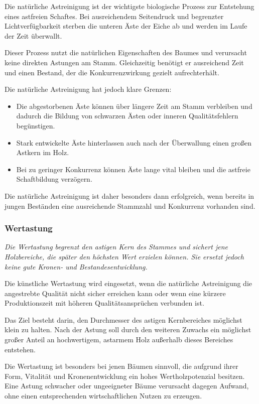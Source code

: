 \documentclass[twocolumn, bibliography=totoc, abstract=true]{scrartcl}
\begin{document}
Die natürliche Astreinigung ist der wichtigste biologische Prozess zur Entstehung eines astfreien Schaftes. Bei ausreichendem Seitendruck und begrenzter Lichtverfügbarkeit sterben die unteren Äste der Eiche ab und werden im Laufe der Zeit überwallt.

Dieser Prozess nutzt die natürlichen Eigenschaften des Baumes und verursacht keine direkten Astungen am Stamm. Gleichzeitig benötigt er ausreichend Zeit und einen Bestand, der die Konkurrenzwirkung gezielt aufrechterhält.

Die natürliche Astreinigung hat jedoch klare Grenzen:

\begin{itemize}
\item Die abgestorbenen Äste können über längere Zeit am Stamm verbleiben und dadurch die Bildung von schwarzen Ästen oder inneren Qualitätsfehlern begünstigen.
\item Stark entwickelte Äste hinterlassen auch nach der Überwallung einen großen Astkern im Holz.
\item Bei zu geringer Konkurrenz können Äste lange vital bleiben und die astfreie Schaftbildung verzögern.
\end{itemize}

Die natürliche Astreinigung ist daher besonders dann erfolgreich, wenn bereits in jungen Beständen eine ausreichende Stammzahl und Konkurrenz vorhanden sind.

\subsubsection{Wertastung}

\emph{Die Wertastung begrenzt den astigen Kern des Stammes und sichert jene Holzbereiche, die später den höchsten Wert erzielen können. Sie ersetzt jedoch keine gute Kronen- und Bestandesentwicklung.}

Die künstliche Wertastung wird eingesetzt, wenn die natürliche Astreinigung die angestrebte Qualität nicht sicher erreichen kann oder wenn eine kürzere Produktionszeit mit höheren Qualitätsansprüchen verbunden ist.

Das Ziel besteht darin, den Durchmesser des astigen Kernbereiches möglichst klein zu halten. Nach der Astung soll durch den weiteren Zuwachs ein möglichst großer Anteil an hochwertigem, astarmem Holz außerhalb dieses Bereiches entstehen.

Die Wertastung ist besonders bei jenen Bäumen sinnvoll, die aufgrund ihrer Form, Vitalität und Kronenentwicklung ein hohes Wertholzpotenzial besitzen. Eine Astung schwacher oder ungeeigneter Bäume verursacht dagegen Aufwand, ohne einen entsprechenden wirtschaftlichen Nutzen zu erzeugen.
\end{document}
